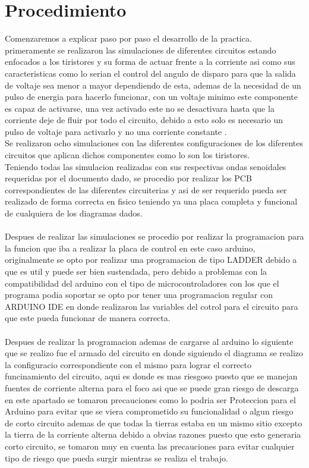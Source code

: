 \documentclass[12pt,a4paper]{article}
\begin{document}
\section{Procedimiento}
Comenzaremos a explicar paso por paso el desarrollo de la practica.\\
primeramente se realizaron las simulaciones de diferentes circuitos estando enfocados a los tiristores y su forma de actuar frente a la corriente asi como sus caracteristicas como lo serian el control del angulo de disparo para que la salida de voltaje sea menor a mayor dependiendo de esta, ademas de la necesidad de un pulso de energia para hacerlo funcionar, con un voltaje minimo este componente es capaz de activarse, una vez activado este no se desactivara hasta que la corriente deje de fluir por todo el circuito, debido a esto solo es necesario un pulso  de voltaje para activarlo y no una corriente constante \cite{portillasemiconductores} .\\
Se realizaron ocho simulaciones con las diferentes configuraciones de los diferentes circuitos que aplican dichos componentes como lo son los tiristores.\\
Teniendo todas las simulacion realizadas con sus respectivas ondas senoidales requeridas por el documento dado, se procedio por realizar los PCB  correspondientes de las diferentes circuiterias y asi de ser requerido pueda ser realizado de forma correcta en fisico teniendo ya una placa completa y funcional de cualquiera de los diagramas dados.\\\\
Despues de realizar las simulaciones se procedio por realizar la programacion para la funcion que iba a realizar la placa de control en este caso arduino, originalmente se opto por realizar una programacion de tipo LADDER debido a que es util y puede ser bien sustendada, pero debido a problemas con la compatibilidad del arduino con el tipo de microcontroladores con los que el programa podia soportar se opto por tener una programacion regular con ARDUINO IDE en donde realizaron las variables del cotrol para el circuito para que este pueda funcionar de manera correcta.\\\\
Despues de realizar la programacion ademas de cargarse al arduino lo siguiente que se realizo fue el armado del circuito en donde siguiendo el diagrama se realizo la configuracio correspondiente con el mismo para lograr el correcto funcinamiento del circuito, aqui es donde es mas riesgoso puesto que se manejan fuentes de corriente alterna para el foco asi que se puede gran riesgo de descarga en este apartado se tomaron precauciones como lo podria ser
Proteccion para el Arduino para evitar que se viera comprometido su funcionalidad o algun riesgo de corto circuito ademas de que
todas la tierras estaba en un mismo sitio excepto la tierra de la corriente alterna debido a obvias razones puesto que esto generaria corto circuito, se tomaron muy en cuenta las precauciones para evitar cualquier tipo de riesgo que pueda surgir mientras se realiza el trabajo.\\
\end{document}

